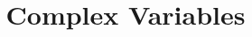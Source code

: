 \documentclass[10pt,a4paper]{article}
\begin{document}
\title{Complex Variables}

 \newpage
 \newpage

\nocite{*}
\printbibliography
\end{document}

